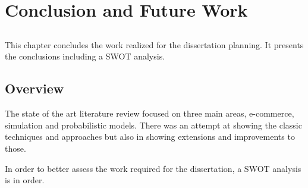 \chapter{Conclusion and Future Work} \label{chap:conclusion}


\section*{}

This chapter concludes the work realized for the dissertation planning. It 
presents the conclusions including a SWOT analysis.

\section{Overview}

The state of the art literature review focused on three main areas, e-commerce, 
simulation and probabilistic models. There was an attempt at showing the 
classic techniques and approaches but also in showing extensions and 
improvements to those.

In order to better assess the work required for the dissertation, a SWOT 
analysis is in order.

% 
% 
% 
% 



